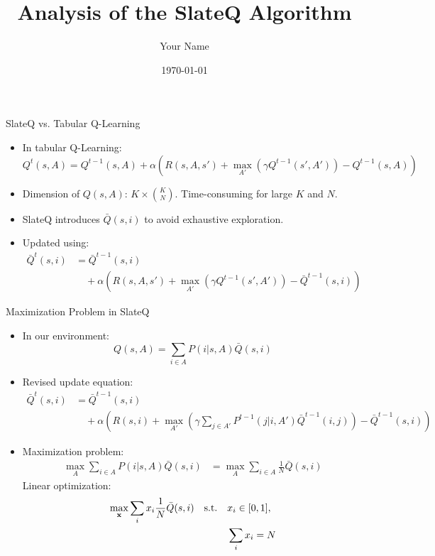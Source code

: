 \documentclass{beamer}
\title{Analysis of the SlateQ Algorithm}
\author{Your Name}
\date{\today}
\begin{document}
\begin{frame}{SlateQ vs. Tabular Q-Learning}
\begin{itemize}
    \item In tabular Q-Learning:
    \begin{equation*}
    Q^t(s,A) = Q^{t-1}(s,A) + \alpha\left(R(s,A,s') + \max_{A'}\left(\gamma Q^{t-1}(s',A')\right) - Q^{t-1}(s,A)\right)
    \end{equation*}
    \item Dimension of $Q(s,A)$: $K\times {K \choose N}$. Time-consuming for large $K$ and $N$.
    \item SlateQ introduces $\bar{Q}(s,i)$ to avoid exhaustive exploration. 
    \item Updated using:
    \begin{align*}
        \bar{Q}^t(s,i) &= \bar{Q}^{t-1}(s,i) \\
        &\quad + \alpha\left(R(s,A,s') + \max_{A'}\left(\gamma Q^{t-1}(s',A')\right) - \bar{Q}^{t-1}(s,i)\right)
    \end{align*}
\end{itemize}
\end{frame}

\begin{frame}{Maximization Problem in SlateQ}
\begin{itemize}
    \item In our environment:
    \begin{equation*}
    Q(s,A) = \sum_{i\in A}P(i|s,A)\bar{Q}(s,i)
    \end{equation*}
    \item Revised update equation:
    \begin{align*}
        \bar{Q}^t(s,i) &= \bar{Q}^{t-1}(s,i) \\
        &\quad + \alpha\left(R(s,i) + \max_{A'}\left(\gamma \sum_{j\in A'}P^{t-1}(j|i,A')\bar{Q}^{t-1}(i,j)\right) - \bar{Q}^{t-1}(s,i)\right)
    \end{align*}
    \item Maximization problem:
    \begin{align*}
    \max_{A}\sum_{i\in A}P(i|s,A)\bar{Q}(s,i) &= \max_{A}\sum_{i\in A}\frac{1}{N}\bar{Q}(s,i) 
    \end{align*}
    Linear optimization:
    \begin{align*}
    \max_{\bf x} \sum_i x_i\frac{1}{N}\bar{Q}(s,i) \quad \text{s.t.} \quad &x_i \in [0,1], \\
    &\sum_{i} x_i = N
    \end{align*}
\end{itemize}
\end{frame}
\end{document}
